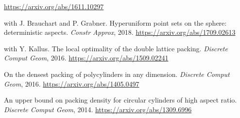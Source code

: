 \documentclass[10pt]{article}
\newenvironment{innerlist}[1][\enskip\textbullet]%
        {\begin{compactitem}[#1]}{\end{compactitem}}
\begin{document}
\begin{innerlist}[-]
\href{https://arxiv.org/abs/1611.10297}{https://arxiv.org/abs/1611.10297}  \\
%
\item with J. Brauchart and P. Grabner. Hyperuniform point sets on the sphere: deterministic aspects. \emph{Constr Approx}, %
2018.
\href{https://arxiv.org/abs/1709.02613}{https://arxiv.org/abs/1709.02613}\\
%
\item with Y. Kallus. The local optimality of the double lattice packing. \emph{Discrete Comput Geom}, %
2016.
\href{https://arxiv.org/abs/1509.02241}{https://arxiv.org/abs/1509.02241} \\
%
\item On the densest packing of polycylinders in any dimension. \emph{Discrete Comput Geom}, %
2016.
\href{https://arxiv.org/abs/1405.0497}{https://arxiv.org/abs/1405.0497} \\
\item An upper bound on packing density for circular cylinders of high aspect ratio. \emph{Discrete Comput Geom}, %
2014.
\href{https://arxiv.org/abs/1309.6996}{https://arxiv.org/abs/1309.6996}

\end{innerlist} %
\end{document}

